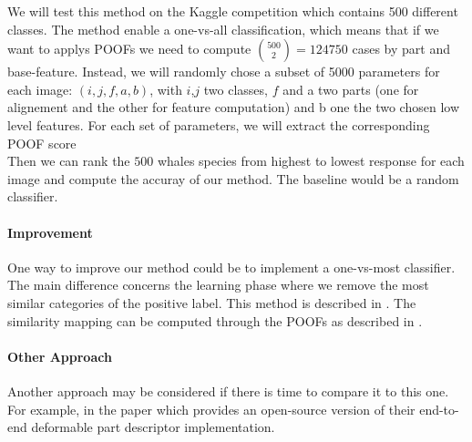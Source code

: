 \documentclass[11pt,a4paper,oneside]{article}
\begin{document}
We will test this method on the Kaggle competition which contains 500 different classes. The method enable a one-vs-all classification, which means that if we want to applys POOFs we need to compute $\binom{500}{2} = 124 750$ cases by part and base-feature. Instead, we will randomly chose a subset of 5000 parameters for each image: $(i,j,f,a,b)$, with $i$,$j$ two classes, $f$ and a two parts (one for alignement and the other for feature computation) and b one the two chosen low level features. For each set of parameters, we will extract the corresponding POOF score\\

Then we can rank the $500$ whales species from highest to lowest response for each image and compute the accuray of our method. The baseline would be a random classifier. 

\paragraph{Improvement}

One way to improve our method could be to implement a one-vs-most classifier. The main difference concerns the learning phase where we remove the most similar categories of the positive label. This method is described in \citep{berg-birdsnap-cvpr2014}. The similarity mapping can be computed through the POOFs as described in \citep{berg-blackbird-iccv2013}.

\paragraph{Other Approach}

Another approach may be considered if there is time to compare it to this one. For example, in the paper \cite{Zhang_2013_ICCV} which provides an open-source version of their end-to-end deformable part descriptor implementation.
\end{document}
